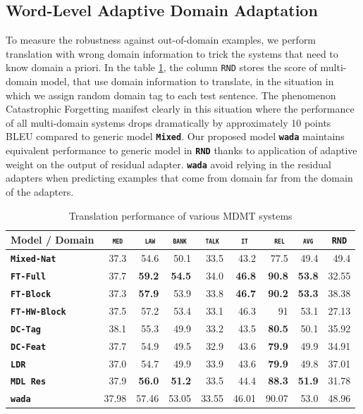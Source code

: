\documentclass[11pt,a4paper]{article}
\newcommand{\fyDone}[1]{\done[FY]\Todo[FY:]{\textcolor{orange}{#1}}}
\newcommand{\mpTodo}[1]{\Todo[MP:]{\textcolor{green}{#1}}}
\newcommand{\domain}[1]{\texttt{\textsc{#1}}}
\newcommand{\system}[1]{\texttt{\textbf{#1}}}
\newcommand{\SB}[1]{\textbf{#1}}
\begin{document}
\subsection{Word-Level Adaptive Domain Adaptation \label{sec:wada}}
\mpTodo{wada}
To measure the robustness against out-of-domain examples, we perform translation with wrong domain information to trick the systems that need to know domain a priori. In the table \ref{tab:performance-random}, the column \domain{RND} stores the score of multi-domain model, that use domain information to translate, in the situation in which we assign random domain tag to each test sentence. The phenomenon Catastrophic Forgetting manifest clearly in this situation where the performance of all multi-domain systems drops dramatically by approximately 10 points BLEU compared to generic model \system{Mixed}. Our proposed model \system{wada} maintains equivalent performance to generic model in \system{RND} thanks to application of adaptive weight on the output of residual adapter. \system{wada} avoid relying in the residual adapters when predicting examples that come from domain far from the domain of the adapters.

\begin{table}[htbp]
  \centering
  \fyDone{Fix column size}
  \begin{tabular}{|p{3cm}|*{8}{r|}} \hline
    Model / Domain & \multicolumn{1}{c|}{\domain{ med}} & \multicolumn{1}{c|}{\domain{ law}} & \multicolumn{1}{c|}{\domain{bank}} & \multicolumn{1}{c|}{\domain{talk}} & \multicolumn{1}{c|}{\domain{ it }} & \multicolumn{1}{c|}{\domain{ rel}} & \multicolumn{1}{c|}{\domain{avg}} & \multicolumn{1}{c|}{\domain{RND}} \\ \hline  
    \system{Mixed-Nat}  & 37.3 & 54.6 & 50.1 & 33.5 & 43.2 & 77.5  &  49.4 & 49.4 \\
    \system{FT-Full}       & 37.7 & \SB{59.2} & \SB{54.5} & 34.0 & \SB{46.8} & \SB{90.8} &  \SB{53.8} & 32.55 \\
   \system{FT-Block}     & 37.3 & \SB{57.9} & 53.9 & 33.8 & \SB{46.7} & \SB{90.2}  &  \SB{53.3} & 38.38 \\ \hline 
   \system{FT-HW-Block}   & 37.5 & 57.2 & 53.4 & 33.1 & 46.3 & 91 & 53.1 & 27.13\\ 
    \system{DC-Tag}       & 38.1 & 55.3 & 49.9   & 33.2 & 43.5 & \SB{80.5}  & 50.1 & 35.92   \\
    \system{DC-Feat}      & 37.7  & 54.9 & 49.5   & 32.9 & 43.6 & \SB{79.9} & 49.9 & 34.91 \\
    \system{LDR}            & 37.0   & 54.7 & 49.9 & 33.9 & 43.6 & \SB{79.9} & 49.8          & 37.01 \\
    \system{MDL Res}     & 37.9 & \SB{56.0}  & \SB{51.2}   & 33.5   &  44.4  & \SB{88.3} & \SB{51.9} & 31.78 \\
    \system{wada}    & 37.98 &	57.46&	53.05&	33.55&	46.01&	90.07&	53.0&	48.96 \\
     \hline
  \end{tabular}
  \caption{Translation performance of various MDMT systems}
  \label{tab:performance-random}
\end{table}
\end{document}
